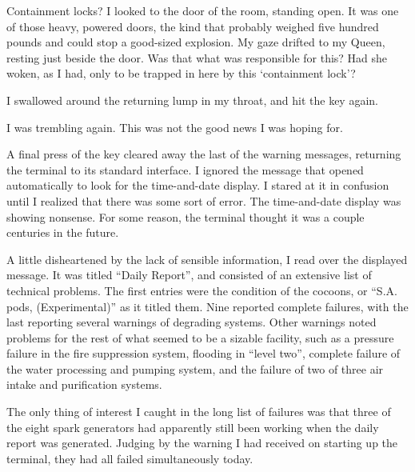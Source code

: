 Containment locks? I looked to the door of the room, standing open. It was one of those heavy, powered doors, the kind that probably weighed five hundred pounds and could stop a good-sized explosion. My gaze drifted to my Queen, resting just beside the door. Was that what was responsible for this? Had she woken, as I had, only to be trapped in here by this ‘containment lock’?

I swallowed around the returning lump in my throat, and hit the key again.


I was trembling again. This was not the good news I was hoping for.

A final press of the key cleared away the last of the warning messages, returning the terminal to its standard interface. I ignored the message that opened automatically to look for the time-and-date display. I stared at it in confusion until I realized that there was some sort of error. The time-and-date display was showing nonsense. For some reason, the terminal thought it was a couple centuries in the future.

A little disheartened by the lack of sensible information, I read over the displayed message. It was titled “Daily Report”, and consisted of an extensive list of technical problems. The first entries were the condition of the cocoons, or “S.A. pods, (Experimental)” as it titled them. Nine reported complete failures, with the last reporting several warnings of degrading systems. Other warnings noted problems for the rest of what seemed to be a sizable facility, such as a pressure failure in the fire suppression system, flooding in “level two”, complete failure of the water processing and pumping system, and the failure of two of three air intake and purification systems.

The only thing of interest I caught in the long list of failures was that three of the eight spark generators had apparently still been working when the daily report was generated. Judging by the warning I had received on starting up the terminal, they had all failed simultaneously today.

